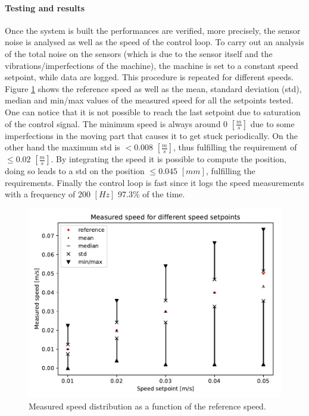 \documentclass[12pt,a4paper, twoside]{article}
\begin{document}
\begin{multicols}{2}
\paragraph{Testing and results}
Once the system is built the performances are verified, more precisely, the sensor noise is analysed as well as the speed of the control loop. To carry out an analysis of the total noise on the sensors (which is due to the sensor itself and the vibrations/imperfections of the machine), the machine is set to a constant speed setpoint, while data are logged. This procedure is repeated for different speeds. Figure \ref{fig:steady_state_0} shows the reference speed as well as the mean, standard deviation (std), median and min/max values of the measured speed for all the setpoints tested. One can notice that it is not possible to reach the last setpoint due to saturation of the control signal. The minimum speed is always around 0 $[\frac{m}{s}]$ due to some imperfections in the moving part that causes it to get stuck periodically. On the other hand the maximum std is $<0.008$ $[\frac{m}{s}]$, thus fulfilling the requirement of $\leq0.02$ $[\frac{m}{s}]$. By integrating the speed it is possible to compute the position, doing so leads to a std on the position $\leq 0.045$ $[mm]$, fulfilling the requirements. Finally the control loop is fast since it logs the speed measurements with a frequency of 200 $[Hz]$ 97.3\% of the time.
\begin{figure}[H]
	\centering
	\includegraphics[width=0.80\linewidth]{fig/steady_state}
	\vspace{-0.1cm}
	\caption{Measured speed distribution as a function of the reference speed.}\label{fig:steady_state_0}
	\vspace{-0.5cm}
\end{figure}

\end{multicols}
\end{document}
